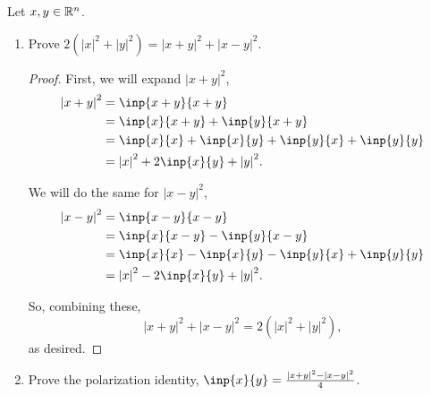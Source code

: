 \documentclass{article}
\begin{document}
\begin{problem}
Let $x,y\in \mathbb{R}^{n}$. \begin{enumerate}[label=\alph*)]
	\item Prove $2\left( {|x|}^2+{|y|}^2 \right) = {|x+y|}^2+{|x-y|}^2$.
	      \begin{proof}[Proof]
		      First, we will expand ${|x+y|}^2$,
		      \begin{align*}
			      {|x+y|}^2 & = \inp{x+y}{x+y}                              \\
			                & = \inp{x}{x+y}+\inp{y}{x+y}                   \\
			                & = \inp{x}{x}+\inp{x}{y}+\inp{y}{x}+\inp{y}{y} \\
			                & = {|x|}^2+2\inp{x }{y }+{|y|}^2.              \\
		      \end{align*}

		      We will do the same for ${|x-y|}^2$,
		      \begin{align*}
			      {|x-y|}^2 & = \inp{x-y}{x-y}                                      \\
			                & = \inp{x }{x-y }-\inp{y }{x-y }                       \\
			                & = \inp{x }{x }-\inp{x }{y }-\inp{y }{x }+\inp{y }{y } \\
			                & = {|x|}^2-2\inp{x }{y }+{|y|}^2.                      \\
		      \end{align*}

		      So, combining these, \[
			      {|x+y|}^2+{|x-y|}^2=2\left( {|x|}^2+{|y|}^2 \right)
			      ,\] as desired.
	      \end{proof}
	\item Prove the polarization identity, $\inp{x}{y}=\frac{{|x+y|}^2-{|x-y|}^2}{4}$.

\end{enumerate}
\end{problem}
\end{document}
